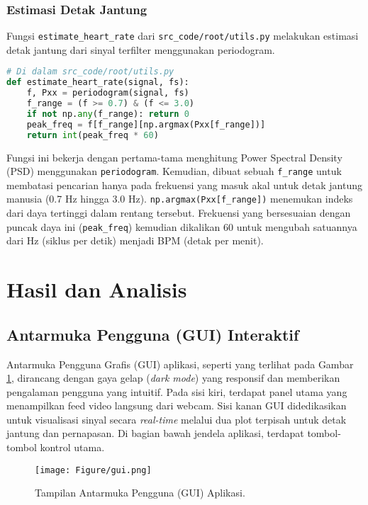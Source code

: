 \documentclass[11pt,a4paper]{article}
\begin{document}
\subsubsection{Estimasi Detak Jantung}
Fungsi \texttt{estimate\_heart\_rate} dari \texttt{src\_code/root/utils.py} melakukan estimasi detak jantung dari sinyal terfilter menggunakan periodogram.
\begin{lstlisting}[language=Python, caption=Estimasi detak jantung dari file \texttt{src\_code/root/utils.py}, label={lst:hr_estimate_new}]
# Di dalam src_code/root/utils.py
def estimate_heart_rate(signal, fs):
    f, Pxx = periodogram(signal, fs)
    f_range = (f >= 0.7) & (f <= 3.0)
    if not np.any(f_range): return 0
    peak_freq = f[f_range][np.argmax(Pxx[f_range])]
    return int(peak_freq * 60)
\end{lstlisting}
Fungsi ini bekerja dengan pertama-tama menghitung Power Spectral Density (PSD) menggunakan \texttt{periodogram}. Kemudian, dibuat sebuah \texttt{f\_range} untuk membatasi pencarian hanya pada frekuensi yang masuk akal untuk detak jantung manusia (0.7 Hz hingga 3.0 Hz). \texttt{np.argmax(Pxx[f\_range])} menemukan indeks dari daya tertinggi dalam rentang tersebut. Frekuensi yang bersesuaian dengan puncak daya ini (\texttt{peak\_freq}) kemudian dikalikan 60 untuk mengubah satuannya dari Hz (siklus per detik) menjadi BPM (detak per menit).

\section{Hasil dan Analisis}
\subsection{Antarmuka Pengguna (GUI) Interaktif}
Antarmuka Pengguna Grafis (GUI) aplikasi, seperti yang terlihat pada Gambar \ref{fig:gui_aplikasi}, dirancang dengan gaya gelap (\textit{dark mode}) yang responsif dan memberikan pengalaman pengguna yang intuitif. Pada sisi kiri, terdapat panel utama yang menampilkan feed video langsung dari webcam. Sisi kanan GUI didedikasikan untuk visualisasi sinyal secara \textit{real-time} melalui dua plot terpisah untuk detak jantung dan pernapasan. Di bagian bawah jendela aplikasi, terdapat tombol-tombol kontrol utama.

\begin{figure}[htbp] 
    \centering
    \texttt{[image: Figure/gui.png]}
    \caption{Tampilan Antarmuka Pengguna (GUI) Aplikasi.}
    \label{fig:gui_aplikasi}
\end{figure}
\end{document}
